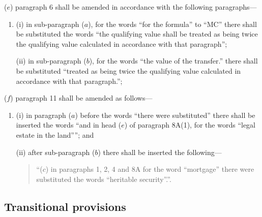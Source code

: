\documentclass[12pt,a4paper]{article}
\begin{document}
\begin{enumerate}
($e$) paragraph 6 shall be amended in accordance with the following paragraphs—
\begin{enumerate}\item[]
(i) in sub-paragraph ($a$), for the words “for the formula” to “MC” there shall be substituted the words “the qualifying value shall be treated as being twice the qualifying value calculated in accordance with that paragraph”;

(ii) in sub-paragraph ($b$), for the words “the value of the transfer.” there shall be substituted “treated as being twice the qualifying value calculated in accordance with that paragraph.”;
\end{enumerate}

($f$) paragraph 11 shall be amended as follows—
\begin{enumerate}\item[]
(i) in paragraph ($a$) before the words “there were substituted” there shall be inserted the words “and in head ($e$) of paragraph 8A(1), for the words “legal estate in the land””; and

(ii) after sub-paragraph ($b$) there shall be inserted the following—
\begin{quotation}
“($c$) in paragraphs 1, 2, 4 and 8A for the word “mortgage” there were substituted the words “heritable security”.”.
\end{quotation}
\end{enumerate}
\end{enumerate}


\subsection[7. Transitional provisions]{Transitional provisions}

\end{document}
